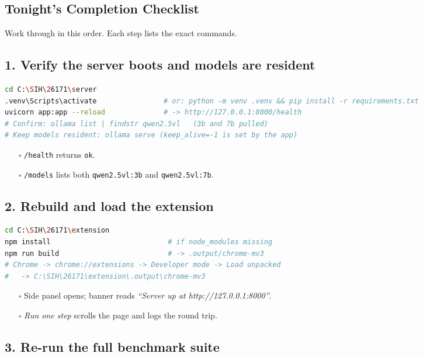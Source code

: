 \documentclass[11pt,a4paper]{article}
\newcommand{\code}[1]{\texttt{#1}}
\newcommand{\todo}{\textcolor{amber}{$\square$}}
\begin{document}
\begin{itemize}
\section{Tonight's Completion Checklist} \label{sec:tonight}

Work through in this order. Each step lists the exact commands.

\subsection{1. Verify the server boots and models are resident}

\begin{lstlisting}[language=bash]
cd C:\SIH\26171\server
.venv\Scripts\activate                # or: python -m venv .venv && pip install -r requirements.txt
uvicorn app:app --reload              # -> http://127.0.0.1:8000/health
# Confirm: ollama list | findstr qwen2.5vl   (3b and 7b pulled)
# Keep models resident: ollama serve (keep_alive=-1 is set by the app)
\end{lstlisting}

\begin{itemize}
\item[\todo] \code{/health} returns \code{ok}.
\item[\todo] \code{/models} lists both \code{qwen2.5vl:3b} and \code{qwen2.5vl:7b}.
\end{itemize}

\subsection{2. Rebuild and load the extension}

\begin{lstlisting}[language=bash]
cd C:\SIH\26171\extension
npm install                            # if node_modules missing
npm run build                          # -> .output/chrome-mv3
# Chrome -> chrome://extensions -> Developer mode -> Load unpacked
#   -> C:\SIH\26171\extension\.output\chrome-mv3
\end{lstlisting}

\begin{itemize}
\item[\todo] Side panel opens; banner reads \emph{``Server up at http://127.0.0.1:8000''}.
\item[\todo] \emph{Run one step} scrolls the page and logs the round trip.
\end{itemize}

\subsection{3. Re-run the full benchmark suite}


\end{itemize}
\end{document}
